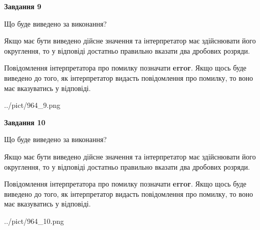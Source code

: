 \documentclass[12pt, ukrainian]{article}
\begin{document}
{\begin {Large}
{\begin {center}\textbf{Завдання 9}\end {center}}\par
Що буде виведено за виконання? \par

Якщо має бути виведено дійсне значення та інтерпретатор має здійснювати його округлення, 
то у відповіді достатньо правильно вказати два дробових розряди.

Повідомлення інтерпретатора про помилку позначати \textbf{error}.
Якщо щось буде виведено до того, як інтерпретатор видасть повідомлення про помилку, 
то воно має вказуватись у відповіді. \par

\begin{center}
	{../pict/964_9.png}
\end{center}
\newpage

{\begin {center}\textbf{Завдання 10}\end {center}}\par
Що буде виведено за виконання? \par

Якщо має бути виведено дійсне значення та інтерпретатор має здійснювати його округлення, 
то у відповіді достатньо правильно вказати два дробових розряди.

Повідомлення інтерпретатора про помилку позначати \textbf{error}.
Якщо щось буде виведено до того, як інтерпретатор видасть повідомлення про помилку, 
то воно має вказуватись у відповіді. \par

\begin{center}
	{../pict/964_10.png}
\end{center}
\newpage

\end {Large}}
\end{document}
